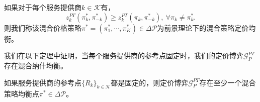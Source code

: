 \begin{df}
如果对于每个服务提供商$k\in\mathcal{K}$有，
\begin{equation}
z_{k}^{PT}(\pi_{k}^*,\pi_{-k}^*)\geq z_{k}^{PT}(\pi_{k},\pi_{-k}^*),~\forall \pi_k\ne\pi_k^*.
\end{equation}
则我们称该混合价格策略$\pi^*=(\pi_{1}^*,\cdots,\pi_{K}^*)\in\Delta\mathcal{P}$为前景理论下的混合策略定价均衡。
\end{df}

我们在以下定理中证明，当每个服务提供商的参考点固定时，我们的定价博弈$\mathcal{G}_{P}^{PT}$存在混合纳什均衡。
\begin{thm}\label{thm:exist2}
如果服务提供商的参考点$\{R_k\}_{k\in\mathcal{K}}$都是固定的，则定价博弈$\mathcal{G}^{PT}_{P}$存在至少一个混合策略均衡点$\pi^{*}\in\Delta\mathcal{P}$。
\end{thm}
